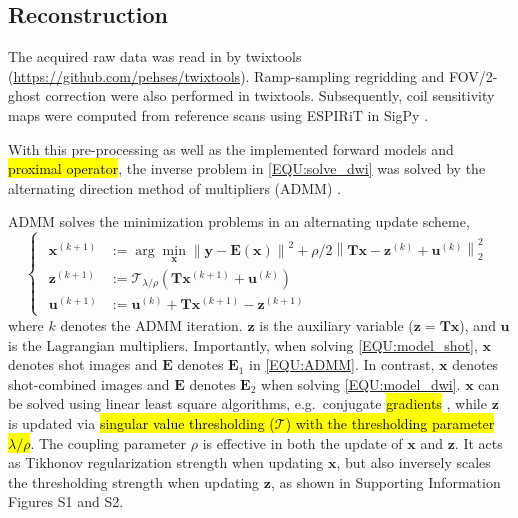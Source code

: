 \documentclass[preprint,12pt,authoryear,review]{elsarticle}
\newcommand*{\norm}[1]{\left\lVert#1\right\rVert}
\newcommand{\argmin}{\arg\!\min}
\begin{document}
    \subsection{Reconstruction}

    The acquired raw data was read in by twixtools
    (\url{https://github.com/pehses/twixtools}).
    Ramp-sampling regridding and FOV/2-ghost correction were also performed in twixtools.
    Subsequently, coil sensitivity maps were computed from reference scans
    using ESPIRiT \citep{uecker_2014_espirit} in SigPy \citep{ong_2019_sigpy}.

    With this pre-processing as well as
    the implemented forward models and \hl{proximal operator},
    the inverse problem in \cref{EQU:solve_dwi} was solved by
    the alternating direction method of multipliers (ADMM) \citep{boyd_2010_admm}.

    ADMM solves the minimization problems in an alternating update scheme,
    \begin{equation}
        \left\{\begin{matrix}
            \begin{aligned}
                \mathbf{x}^{(k+1)} &:= \argmin_{\mathbf{x}} \norm{\mathbf{y} - \mathbf{E}(\mathbf{x})}^2 + \rho/2 \norm{\mathbf{T}\mathbf{x} - \mathbf{z}^{(k)} + \mathbf{u}^{(k)}}_2^2 \\
                \mathbf{z}^{(k+1)} &:= \mathcal{T}_{\lambda/\rho} (\mathbf{T} \mathbf{x}^{(k+1)} + \mathbf{u}^{(k)}) \\
                \mathbf{u}^{(k+1)} &:= \mathbf{u}^{(k)} + \mathbf{T} \mathbf{x}^{(k+1)} - \mathbf{z}^{(k+1)}
            \end{aligned}
        \end{matrix}\right.
        \label{EQU:ADMM}
    \end{equation}
    where $k$ denotes the ADMM iteration.
    $\mathbf{z}$ is the auxiliary variable ($\mathbf{z} = \mathbf{T}\mathbf{x}$),
    and $\textbf{u}$ is the Lagrangian multipliers.
    Importantly, when solving \cref{EQU:model_shot},
    $\textbf{x}$ denotes shot images and $\mathbf{E}$ denotes $\mathbf{E}_1$ in \cref{EQU:ADMM}.
    In contrast, $\textbf{x}$ denotes shot-combined images and $\mathbf{E}$ denotes $\mathbf{E}_2$
    when solving \cref{EQU:model_dwi}.
    $\mathbf{x}$ can be solved using linear least square algorithms, 
    e.g.~conjugate \hl{gradients} \citep{hestenes_1952_cg},
    while $\mathbf{z}$ is updated via \hl{singular value thresholding
    (\mbox{$\mathcal{T}$}) with the thresholding parameter \mbox{$\lambda / \rho$}}.
    The coupling parameter $\rho$ is effective in both the update of $\mathbf{x}$ and $\mathbf{z}$.
    It acts as Tikhonov regularization strength when updating $\mathbf{x}$,
    but also inversely scales the thresholding strength when updating $\mathbf{z}$,
    as shown in Supporting Information Figures S1 and S2.
\end{document}
